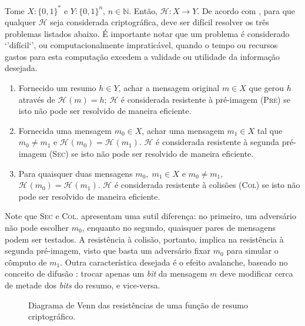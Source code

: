 \documentclass[12pt]{report}
\newcommand{\hh}{$\mathcal{H}$}
\newcommand{\hash}[2][]{\mathcal{H}^{#1}(#2)}
\newcommand{\binwds}[1]{\{0, 1\}^{#1}}
\def\precircle{(0.00, 0) circle (1.25cm)}
\def\seccircle{(1.75, 0) circle (1.25cm)}
\def\colcircle{(1.75, 0) circle (0.75cm)}
\begin{document}
Tome $X : \binwds{*}$ e $Y : \binwds{n}$, $n \in \mathbb{N}$. Então,
$\mathcal{H} : X \longrightarrow Y$. De acordo com
\cite{stinson2005cryptography}, para que qualquer \hh{} seja considerada
criptográfica, deve ser difícil resolver os três problemas listados abaixo.
É importante notar que um problema é considerado `'difícil`', ou
computacionalmente impraticável, quando o tempo ou recursos gastos para esta
computação excedem a validade ou utilidade da informação desejada.

\begin{enumerate}[label=\roman*.]

  \item Fornecido um resumo $h \in Y$, achar a mensagem original $m \in X$ que
    gerou $h$ através de $\hash{m} = h$; \hh{} é considerada resistente à
    pré-imagem (\textsc{Pre}) se isto não pode ser resolvido de maneira
    eficiente.

  \item Fornecida uma mensagem $m_0 \in X$, achar uma mensagem $m_1 \in X$ tal
    que $m_0 \neq m_1$ e $\hash{m_0} = \hash{m_1}$. \hh{} é considerada
    resistente à segunda pré-imagem (\textsc{Sec}) se isto não pode ser
    resolvido de maneira eficiente.

  \item Para quaisquer duas mensagens $m_0, \; m_1 \in X$ e $m_0 \neq m_1$,
    $\hash{m_0} = \hash{m_1}$. \hh{} é considerada resistente à colisões
    (\textsc{Col}) se isto não pode ser resolvido de maneira eficiente.

\end{enumerate}

Note que \textsc{Sec} e \textsc{Col}. apresentam uma sutil diferença: no
primeiro, um adversário não pode escolher $m_0$, enquanto no segundo, quaisquer
pares de mensagens podem ser testados. A resistência à colisão, portanto,
implica na resistência à segunda pré-imagem, visto que basta um adversário
fixar $m_0$ para simular o cômputo de $m_1$. Outra característica desejada é o
efeito avalanche, baseado no conceito de difusão
\cite{Stallings:2010:CNS:1824151}: trocar apenas um \emph{bit} da mensagem $m$
deve modificar cerca de metade dos \emph{bits} do resumo, e vice-versa.

\begin{figure}[h]
  \centering
  \caption{Diagrama de Venn das resistências de uma função de resumo
    criptográfico.}
  \label{fig:1}
\end{figure}
\end{document}
